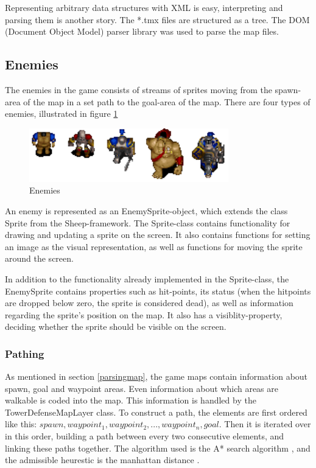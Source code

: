 Representing arbitrary data structures with XML is easy, interpreting and parsing them is another story. The *.tmx files are structured as a tree. The DOM (Document Object Model) parser library was used to parse the map files. \cite{dom}


\subsection{Enemies}

The enemies in the game consists of streams of sprites moving from the spawn-area of the map in a set path to the goal-area of the map. There are four types of enemies, illustrated in figure \ref{fig:enemies}

\begin{figure}[htbp]
	\centering
		\includegraphics{main/figures/enemies}
	\caption{Enemies}
	\label{fig:enemies}
\end{figure}


An enemy is represented as an EnemySprite-object, which extends the class Sprite from the Sheep-framework. The Sprite-class contains functionality for drawing and updating a sprite on the screen. It also contains functions for setting an image as the visual representation, as well as functions for moving the sprite around the screen. 

In addition to the functionality already implemented in the Sprite-class, the EnemySprite contains properties such as hit-points, its status (when the hitpoints are dropped below zero, the sprite is considered dead), as well as information regarding the sprite's position on the map. It also has a visiblity-property, deciding whether the sprite should be visible on the screen. 

\subsubsection{Pathing}
As mentioned in section \ref{parsingmap}, the game maps contain information about spawn, goal and waypoint areas. Even information about which areas are walkable is coded into the map. This information is handled by the TowerDefenseMapLayer class. To construct a path, the elements are first ordered like this: $spawn, waypoint_1, waypoint_2, ..., waypoint_n, goal$. Then it is iterated over in this order, building a path between every two consecutive elements, and linking these paths together. The algorithm used is the A* search algorithm \cite{aima}, and the admissible heurestic is the manhattan distance \cite{wiki:manhattan}.

